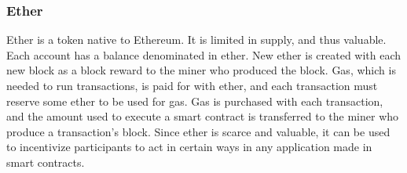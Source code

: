 \subsubsection{Ether}
Ether is a token native to Ethereum. It is limited in supply, and thus valuable. Each account has a balance denominated in ether. New ether is created with each new block as a block reward to the miner who produced the block. Gas, which is needed to run transactions, is paid for with ether, and each transaction must reserve some ether to be used for gas. Gas is purchased with each transaction, and the amount used to execute a smart contract is transferred to the miner who produce a transaction's block. Since ether is scarce and valuable, it can be used to incentivize participants to act in certain ways in any application made in smart contracts. 